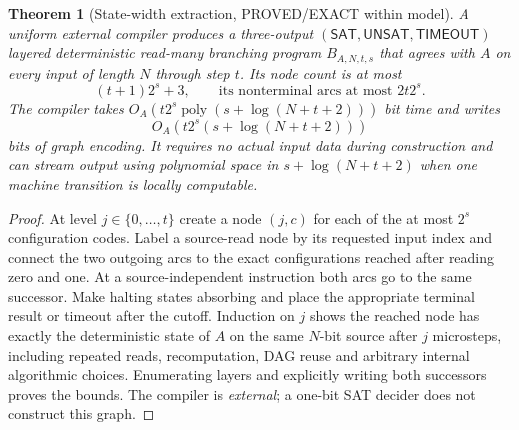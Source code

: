 \documentclass[11pt]{article}
\newtheorem{theorem}{Theorem}
\begin{document}
\begin{theorem}[State-width extraction, PROVED/EXACT within model]
A uniform external compiler produces a three-output $(\mathsf{SAT},\mathsf{UNSAT},\mathsf{TIMEOUT})$ layered deterministic \emph{read-many} branching program $B_{A,N,t,s}$ that agrees with $A$ on every input of length $N$ through step $t$. Its node count is at most
\[
 (t+1)2^s+3,\qquad \text{its nonterminal arcs at most }2t2^s. \tag{2}
\]
The compiler takes $O_A(t2^s\operatorname{poly}(s+\log(N+t+2)))$ bit time and writes
\[
 O_A(t2^s(s+\log(N+t+2))) \tag{3}
\]
bits of graph encoding. It requires no actual input data during construction and can stream output using polynomial space in $s+\log(N+t+2)$ when one machine transition is locally computable.
\end{theorem}
\begin{proof}
At level $j\in\{0,\ldots,t\}$ create a node $(j,c)$ for each of the at most $2^s$ configuration codes. Label a source-read node by its requested input index and connect the two outgoing arcs to the exact configurations reached after reading zero and one. At a source-independent instruction both arcs go to the same successor. Make halting states absorbing and place the appropriate terminal result or timeout after the cutoff. Induction on $j$ shows the reached node has exactly the deterministic state of $A$ on the same $N$-bit source after $j$ microsteps, including repeated reads, recomputation, DAG reuse and arbitrary internal algorithmic choices. Enumerating layers and explicitly writing both successors proves the bounds. The compiler is \emph{external}; a one-bit SAT decider does not construct this graph.
\end{proof}
\end{document}
